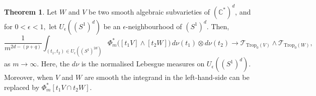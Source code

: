 \documentclass[11pt]{amsart}
\def\Log{{\rm Log}}
\theoremstyle{definition}
\newtheorem{theorem}{Theorem}[section]
\newcommand{\lto}{\longrightarrow}
\newcommand{\C}{\mathbb{C}}
\newcommand{\sT}{\mathscr{T}}
\newcommand{\Trop}{\mathrm{Trop}}
\begin{document}
\begin{theorem}\label{thm:averaging}
    Let $W$ and $V$ be two smooth algebraic subvarieties of $(\C^*)^d$, and for $0<\epsilon <1,$ let $U_{\epsilon}((S^1)^d)$ be an $\epsilon$-neighbourhood of  $(S^1)^d.$ Then,
    $$
    \frac{1}{m^{2d-(p+q)}} \int_{(t_1, t_2)\in   U_{\epsilon}((S^1)^{2d})}\Phi_m^*\big([t_1 V] \wedge [t_2 W]\big)\, d\nu(t_1) \otimes d\nu(t_2) \longrightarrow \sT_{\Trop_0(V)} \wedge \sT_{\Trop_0(W)},
    $$
    as $m \to \infty$. Here, the $d\nu$ is the normalised Lebesgue measures on $U_{\epsilon}((S^1)^d)$. Moreover, when $V$ and $W$ are smooth the integrand in the left-hand-side can be replaced by $\Phi_m^*[t_1 V \cap t_2 W].$
\end{theorem}
\end{document}
